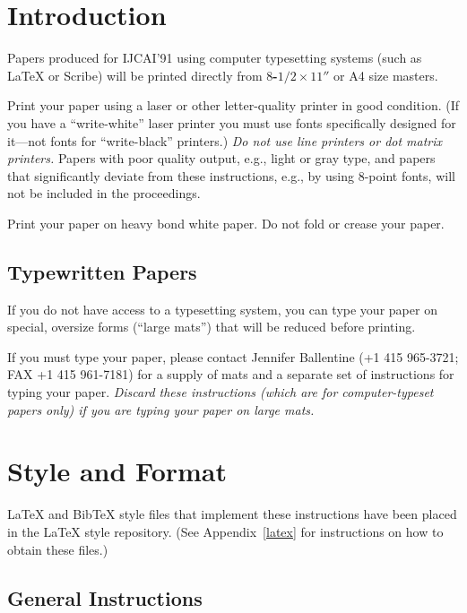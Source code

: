 \section{Introduction}

Papers produced for IJCAI'91 using computer typesetting systems (such as
\LaTeX{} or Scribe) will be printed directly from {\bf $8$-$1/2 \times
11''$} or A4 size masters.

Print your paper using a laser or other letter-quality printer in good
condition.  (If you have a ``write-white'' laser printer you must use fonts
specifically designed for it---not fonts for ``write-black'' printers.)
{\em Do not use line printers or dot matrix printers.} Papers with poor
quality output, e.g., light or gray type, and papers that significantly
deviate from these instructions, e.g., by using 8-point fonts, will not be
included in the proceedings.

Print your paper on heavy bond white paper.  Do not fold or crease your paper.

\subsection{Typewritten Papers}

If you do not have access to a typesetting system, you can type your paper
on special, oversize forms (``large mats'') that will be reduced before
printing.

If you must type your paper, please contact
Jennifer Ballentine (+1 415 965-3721; FAX +1 415 961-7181) %
for a supply of mats and a separate set of instructions for typing your
paper.  {\em Discard these instructions\/ {\em (which are for
computer-typeset papers only)} if you are typing your paper on large mats.}

\section{Style and Format}

\LaTeX{} and Bib\TeX{} style files that implement these instructions have
been placed in the \LaTeX{} style repository.  (See Appendix~\ref{latex} for
instructions on how to obtain these files.)

\subsection{General Instructions}

